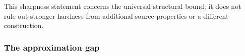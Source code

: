 %
%

This sharpness statement concerns the universal structural bound;
it does not rule out stronger hardness from additional source
properties or a different construction.

\subsubsection{The approximation gap}
\label{subsec:ugc-total-depth-gap}

